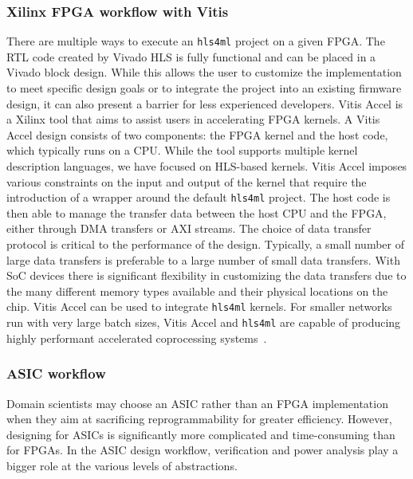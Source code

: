 \documentclass[tinyml]{acmart}
\newcommand{\hlsfml}{\texttt{hls4ml}\xspace}
\begin{document}
\subsubsection{Xilinx FPGA workflow with Vitis}
There are multiple ways to execute an \hlsfml project on a given FPGA.
The RTL code created by Vivado HLS is fully functional and can be placed in a Vivado block design.
While this allows the user to customize the implementation to meet specific design goals or to integrate the project into an existing firmware design, it can also present a barrier for less experienced developers.
Vitis Accel is a Xilinx tool that aims to assist users in accelerating FPGA kernels.
A Vitis Accel design consists of two components: the FPGA kernel and the host code, which typically runs on a CPU.
While the tool supports multiple kernel description languages, we have focused on HLS-based kernels.
Vitis Accel imposes various constraints on the input and output of the kernel that require the introduction of a wrapper around the default \hlsfml project.
The host code is then able to manage the transfer data between the host CPU and the FPGA, either through DMA transfers or AXI streams.
The choice of data transfer protocol is critical to the performance of the design.
Typically, a small number of large data transfers is preferable to a large number of small data transfers.
With SoC devices there is significant flexibility in customizing the data transfers due to the many different memory types available and their physical locations on the chip.
Vitis Accel can be used to integrate \hlsfml kernels.
For smaller networks run with very large batch sizes, Vitis Accel and \hlsfml are capable of producing highly performant accelerated coprocessing systems~\cite{rankin2020fpgasasaservice}.

\subsubsection{ASIC workflow}
Domain scientists may choose an ASIC rather than an FPGA implementation when they aim at sacrificing reprogrammability for greater efficiency.
However, designing for ASICs is significantly more complicated and time-consuming than for FPGAs.
In the ASIC design workflow, verification and power analysis play a bigger role at the various levels of abstractions.
\end{document}
